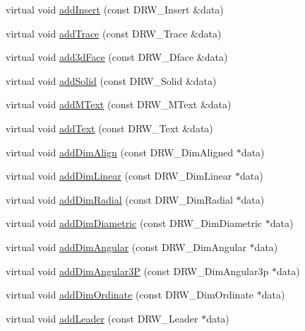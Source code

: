 \begin{DoxyCompactItemize}
\item 
virtual void \hyperlink{class_c_d_x_interface_a3471e7182827cd69a3bd79999565873d}{add\+Insert} (const D\+R\+W\+\_\+\+Insert \&data)
\item 
virtual void \hyperlink{class_c_d_x_interface_a71595aebd0b152a475c5863a95efe9d1}{add\+Trace} (const D\+R\+W\+\_\+\+Trace \&data)
\item 
virtual void \hyperlink{class_c_d_x_interface_afb9d3002c59580b40413956b6cc095de}{add3d\+Face} (const D\+R\+W\+\_\+Dface \&data)
\item 
virtual void \hyperlink{class_c_d_x_interface_a827af5b34de2aae7f2e74f93330f0de8}{add\+Solid} (const D\+R\+W\+\_\+\+Solid \&data)
\item 
virtual void \hyperlink{class_c_d_x_interface_a6ca6a4b827a1e6aee5ef02efc5318049}{add\+M\+Text} (const D\+R\+W\+\_\+\+M\+Text \&data)
\item 
virtual void \hyperlink{class_c_d_x_interface_a17a713b42726ca95864928e2dec13308}{add\+Text} (const D\+R\+W\+\_\+\+Text \&data)
\item 
virtual void \hyperlink{class_c_d_x_interface_a1d8d2396e0bf232f94a7208729e5c836}{add\+Dim\+Align} (const D\+R\+W\+\_\+\+Dim\+Aligned $\ast$data)
\item 
virtual void \hyperlink{class_c_d_x_interface_a54d3e75956a435d5e2eebbf34485b1d5}{add\+Dim\+Linear} (const D\+R\+W\+\_\+\+Dim\+Linear $\ast$data)
\item 
virtual void \hyperlink{class_c_d_x_interface_a7faabe42ef434da4f3eeca9558017430}{add\+Dim\+Radial} (const D\+R\+W\+\_\+\+Dim\+Radial $\ast$data)
\item 
virtual void \hyperlink{class_c_d_x_interface_abdabb05ea578e0cd54c0f544e655bf98}{add\+Dim\+Diametric} (const D\+R\+W\+\_\+\+Dim\+Diametric $\ast$data)
\item 
virtual void \hyperlink{class_c_d_x_interface_a96ff8ffa1b182efde292ebb4a33bd26a}{add\+Dim\+Angular} (const D\+R\+W\+\_\+\+Dim\+Angular $\ast$data)
\item 
virtual void \hyperlink{class_c_d_x_interface_aa7cc560c1a0ce0fd60f4de54c854a507}{add\+Dim\+Angular3\+P} (const D\+R\+W\+\_\+\+Dim\+Angular3p $\ast$data)
\item 
virtual void \hyperlink{class_c_d_x_interface_a17b65ea0d98a8f8c2f9183649df3786d}{add\+Dim\+Ordinate} (const D\+R\+W\+\_\+\+Dim\+Ordinate $\ast$data)
\item 
virtual void \hyperlink{class_c_d_x_interface_a09f4c0c1ba711f5bd437aa7b209be09a}{add\+Leader} (const D\+R\+W\+\_\+\+Leader $\ast$data)

\end{DoxyCompactItemize}
